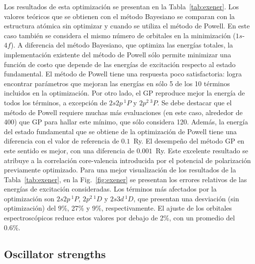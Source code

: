 Los resultados de esta optimización se presentan en la 
Tabla~\ref{tab:exener}. Los valores teóricos que se obtienen con el 
método Bayesiano se comparan con la estructura atómica sin optimizar y 
cuando se utiliza el método de Powell. En este caso también se considera 
el mismo número de orbitales en la minimización ($1s$-$4f$). A 
diferencia del método Bayesiano, que optimiza las energías totales, la 
implementación existente del método de Powell sólo permite minimizar una 
función de costo que depende de las energías de excitación respecto al 
estado fundamental.
El método de Powell tiene una respuesta poco satisfactoria: logra 
encontrar parámetros que mejoran las energías en sólo 5 de los 10 
términos incluidos en la optimización. Por otro lado, el GP reproduce 
mejor la energía de todos los términos, a excepción de $2s2p\,^1P$ y 
$2p^2\,^3P$. Se debe destacar que el método de Powell requiere muchas 
más evaluaciones (en este caso, alrededor de 400) que GP para hallar 
este mínimo, que sólo considera 120. Además, la energía del estado 
fundamental que se obtiene de la optimización de Powell tiene una 
diferencia con el valor de referencia de $0.1$~Ry. El desempeño del 
método GP en este sentido es mejor, con una diferencia de $0.001$~Ry. 
Este excelente resultado se atribuye a la correlación core-valencia 
introducida por el potencial de polarización previamente optimizado. 
Para una mejor visualización de los resultados de la 
Tabla~\ref{tab:exener}, en la Fig.~\ref{fig:exener} se presentan los 
errores relativos de las energías de excitación consideradas. Los 
términos más afectados por la optimización son $2s2p\,^1P$, $2p^2\,^1D$ 
y $2s3d\,^1D$, que presentan una desviación (sin optimización) del 9\%, 
27\% y 9\%, respectivamente. El ajuste de los orbitales espectroscópicos 
reduce estos valores por debajo de 2\%, con un promedio del $0.6\%$. 

\subsection{Oscillator strengths}


